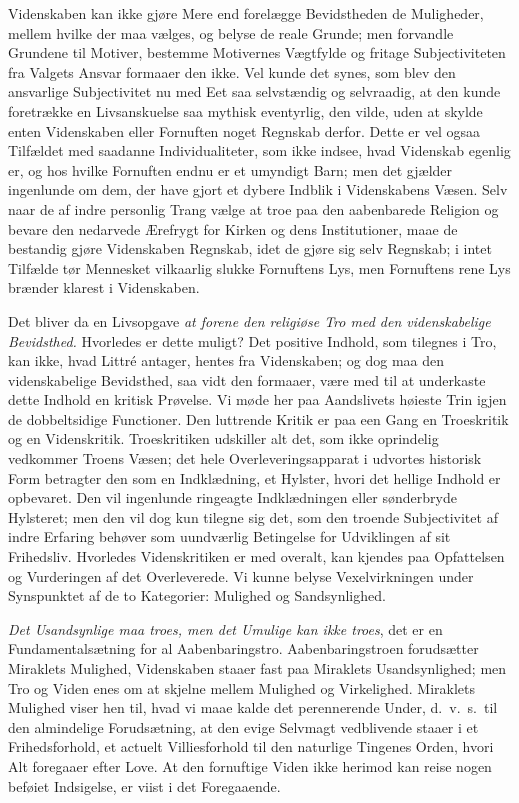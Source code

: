 \documentclass[12pt]{article}
\newcommand{\opage}[1]{\marginnote{\footnotesize\textit{[#1]}}}
\begin{document}
Videnskaben kan ikke gjøre Mere end forelægge Bevidstheden de
Muligheder, mellem hvilke der maa vælges, og belyse de reale Grunde;
men forvandle Grundene til Motiver, bestemme Motivernes Vægtfylde og
fritage Subjectiviteten fra Valgets Ansvar formaaer den ikke. Vel kunde
det synes, som blev den ansvarlige Subjectivitet nu med Eet saa
selvstændig og selvraadig, at den kunde foretrække en Livsanskuelse saa
mythisk eventyrlig, den vilde, uden at skylde enten Videnskaben eller
Fornuften noget Regnskab derfor. Dette er vel ogsaa Tilfældet
\opage{73} med saadanne Individualiteter, som ikke indsee, hvad Videnskab egenlig
er, og hos hvilke Fornuften endnu er et umyndigt Barn; men det gjælder
ingenlunde om dem, der have gjort et dybere Indblik i Videnskabens
Væsen. Selv naar de af indre personlig Trang vælge at troe paa den
aabenbarede Religion og bevare den nedarvede Ærefrygt for Kirken og
dens Institutioner, maae de bestandig gjøre Videnskaben Regnskab, idet
de gjøre sig selv Regnskab; i intet Tilfælde tør Mennesket vilkaarlig
slukke Fornuftens Lys, men Fornuftens rene Lys brænder klarest i
Videnskaben.

Det bliver da en Livsopgave \emph{at forene den religiøse Tro med den
videnskabelige Bevidsthed.} Hvorledes er dette muligt? Det positive
Indhold, som tilegnes i Tro, kan ikke, hvad Littré antager, hentes fra
Videnskaben; og dog maa den videnskabelige Bevidsthed, saa vidt den
formaaer, være med til at underkaste dette Indhold en kritisk Prøvelse.
Vi møde her paa Aandslivets høieste Trin igjen de dobbeltsidige
Functioner. Den luttrende Kritik er paa een Gang en Troeskritik og en
Videnskritik. Troeskritiken udskiller alt det, som ikke oprindelig
vedkommer Troens Væsen; det hele Overleveringsapparat i udvortes
historisk Form betragter den som en Indklædning, et Hylster, hvori det
hellige Indhold er opbevaret. Den vil ingenlunde ringeagte
Indklædningen eller sønderbryde Hylsteret; men den vil dog kun tilegne
sig det, som den troende Subjectivitet af indre Erfaring behøver som
uundværlig Betingelse for Udviklingen af sit Frihedsliv. Hvorledes
Videnskritiken er med overalt, kan kjendes paa Opfattelsen og
Vurderingen af det Overleverede. Vi kunne belyse Vexelvirkningen under
Synspunktet af de to Kategorier: Mulighed og Sandsynlighed.

\emph{Det Usandsynlige maa troes, men det Umulige kan ikke troes}, det
er en Fundamentalsætning for al Aabenbaringstro. Aabenbaringstroen
forudsætter Miraklets Mulighed, Videnskaben staaer fast paa Miraklets
Usandsynlighed; men Tro og Viden enes om at skjelne mellem Mulighed og
Virkelighed. Miraklets Mulighed viser hen til, hvad vi maae kalde
\opage{74} det perennerende Under, d.\ v.\ s.\ til den almindelige Forudsætning,
at den evige Selvmagt vedblivende staaer i et Frihedsforhold, et
actuelt Villiesforhold til den naturlige Tingenes Orden, hvori Alt
foregaaer efter Love. At den fornuftige Viden ikke herimod kan reise
nogen beføiet Indsigelse, er viist i det Foregaaende.
\end{document}
